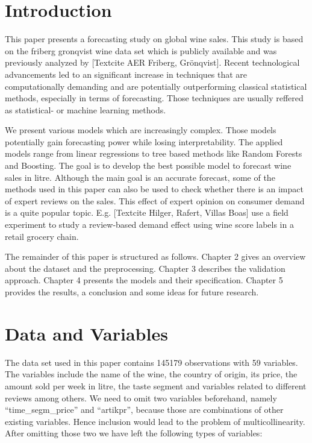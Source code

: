 \documentclass[11pt,]{article}
\begin{document}
{
\hypersetup{linkcolor=black}
\setcounter{tocdepth}{3}
\tableofcontents
}
\newpage
\listoftables
\newpage
\listoffigures
\newpage
{} 
\hypertarget{introduction}{%
\section{Introduction}\label{introduction}}

This paper presents a forecasting study on global wine sales. This study
is based on the friberg gronqvist wine data set which is publicly
available and was previously analyzed by {[}Textcite AER Friberg,
Grönqvist{]}. Recent technological advancements led to an significant
increase in techniques that are computationally demanding and are
potentially outperforming classical statistical methods, especially in
terms of forecasting. Those techniques are usually reffered as
statistical- or machine learning methods.

We present various models which are increasingly complex. Those models
potentially gain forecasting power while losing interpretability. The
applied models range from linear regressions to tree based methods like
Random Forests and Boosting. The goal is to develop the best possible
model to forecast wine sales in litre. Although the main goal is an
accurate forecast, some of the methods used in this paper can also be
used to check whether there is an impact of expert reviews on the sales.
This effect of expert opinion on consumer demand is a quite popular
topic. E.g. {[}Textcite Hilger, Rafert, Villas Boas{]} use a field
experiment to study a review-based demand effect using wine score labels
in a retail grocery chain.

The remainder of this paper is structured as follows. Chapter 2 gives an
overview about the dataset and the preprocessing. Chapter 3 describes
the validation approach. Chapter 4 presents the models and their
specification. Chapter 5 provides the results, a conclusion and some
ideas for future research.

\hypertarget{data-and-variables}{%
\section{Data and Variables}\label{data-and-variables}}

The data set used in this paper contains 145179 observations with 59
variables. The variables include the name of the wine, the country of
origin, its price, the amount sold per week in litre, the taste segment
and variables related to different reviews among others. We need to omit
two variables beforehand, namely \enquote{time\_segm\_price} and
\enquote{artikpr}, because those are combinations of other existing
variables. Hence inclusion would lead to the problem of
multicollinearity. After omitting those two we have left the following
types of variables:
\end{document}

